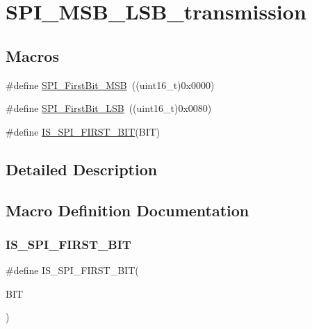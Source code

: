 \hypertarget{group___s_p_i___m_s_b___l_s_b__transmission}{}\section{S\+P\+I\+\_\+\+M\+S\+B\+\_\+\+L\+S\+B\+\_\+transmission}
\label{group___s_p_i___m_s_b___l_s_b__transmission}
\subsection*{Macros}
\begin{DoxyCompactItemize}
\item 
\#define \mbox{\hyperlink{group___s_p_i___m_s_b___l_s_b__transmission_ga45e688f93a93b605886240cad23bc2eb}{S\+P\+I\+\_\+\+First\+Bit\+\_\+\+M\+SB}}~((uint16\+\_\+t)0x0000)
\item 
\#define \mbox{\hyperlink{group___s_p_i___m_s_b___l_s_b__transmission_ga5ef57fca79434cbc517e4ede548ca02d}{S\+P\+I\+\_\+\+First\+Bit\+\_\+\+L\+SB}}~((uint16\+\_\+t)0x0080)
\item 
\#define \mbox{\hyperlink{group___s_p_i___m_s_b___l_s_b__transmission_gabee8e0302741f4a5c41b96af640c63ad}{I\+S\+\_\+\+S\+P\+I\+\_\+\+F\+I\+R\+S\+T\+\_\+\+B\+IT}}(B\+IT)
\end{DoxyCompactItemize}


\subsection{Detailed Description}


\subsection{Macro Definition Documentation}
\mbox{\label{group___s_p_i___m_s_b___l_s_b__transmission_gabee8e0302741f4a5c41b96af640c63ad}} 
\subsubsection{\texorpdfstring{IS\_SPI\_FIRST\_BIT}{IS\_SPI\_FIRST\_BIT}}
{\footnotesize\ttfamily \#define I\+S\+\_\+\+S\+P\+I\+\_\+\+F\+I\+R\+S\+T\+\_\+\+B\+IT(\begin{DoxyParamCaption}\item[{}]{B\+IT }\end{DoxyParamCaption})}

